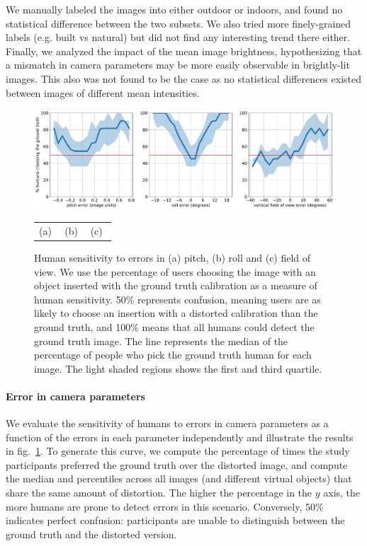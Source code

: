 We manually labeled the images into either outdoor or indoors, and found no statistical difference between the two subsets. We also tried more finely-grained labels (e.g. built vs natural) but did not find any interesting trend there either. Finally, we analyzed the impact of the mean image brightness, hypothesizing that a mismatch in camera parameters may be more easily observable in brightly-lit images. This also was not found to be the case as no statistical differences existed between images of different mean intensities. 

\begin{figure}
\centering
\includegraphics[width=\linewidth]{figures/pstudy/reduced_param_errors_pm_image_units_confusion.pdf} \\
\vspace{-0.1cm}
\begin{tabular}{p{0.3\linewidth}p{0.3\linewidth}p{0.3\linewidth}}
\hspace{1.15cm}(a) & \hspace{1cm}(b) & \hspace{0.85cm}(c)
\end{tabular}
\caption{Human sensitivity to errors in (a) pitch, (b) roll and (c) field of view. We use the percentage of users choosing the image with an object inserted with the ground truth calibration as a measure of human sensitivity. 50\% represents confusion, meaning users are as likely to choose an insertion with a distorted calibration than the ground truth, and 100\% means that all humans could detect the ground truth image. The line represents the median of the percentage of people who pick the ground truth human for each image. The light shaded regions shows the first and third quartile.}
\label{fig:pstudy_overall_sensitivity}
\end{figure}


\paragraph{Error in camera parameters} We evaluate the sensitivity of humans to errors in camera parameters as a function of the errors in each parameter independently and illustrate the results in fig.~\ref{fig:pstudy_overall_sensitivity}. To generate this curve, we compute the percentage of times the study participants preferred the ground truth over the distorted image, and compute the median and percentiles across all images (and different virtual objects) that share the same amount of distortion. The higher the percentage in the $y$ axis, the more humans are prone to detect errors in this scenario. Conversely, 50\% indicates perfect confusion: participants are unable to distinguish between the ground truth and the distorted version. 

